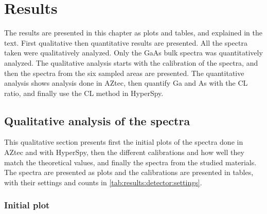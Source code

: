 \chapter{Results}
\label{chap:results}

The results are presented in this chapter as plots and tables, and explained in the text.
First qualitative then quantitative results are presented.
All the spectra taken were qualitatively analyzed.
Only the GaAs bulk spectra was quantitatively analyzed.
The qualitative analysis starts with the calibration of the spectra, and then the spectra from the six sampled areas are presented.
The quantitative analysis shows analysis done in AZtec, then quantify Ga and As with the CL ratio, and finally use the CL method in HyperSpy.















\section{Qualitative analysis of the spectra}
\label{sec:results:qualitative}

This qualitative section presents first the initial plots of the spectra done in AZtec and with HyperSpy, then the different calibrations and how well they match the theoretical values, and finally the spectra from the studied materials.
The spectra are presented as plots and the calibrations are presented in tables, with their settings and counts in \cref{tab:results:detector:settings}.


\subsection{Initial plot}
\label{sec:results:qualitative:initial_plot}

